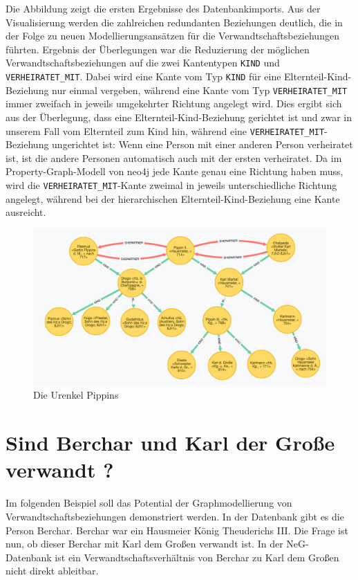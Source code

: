 \documentclass[ngerman,]{scrreprt}
\begin{document}
Die Abbildung zeigt die ersten Ergebnisse des Datenbankimports. Aus der Visualisierung werden die zahlreichen redundanten Beziehungen deutlich, die in der Folge zu neuen Modellierungsansätzen für die Verwandtschaftsbeziehungen führten. Ergebnis der Überlegungen war die Reduzierung der möglichen Verwandtschaftsbeziehungen auf die zwei Kantentypen \texttt{KIND} und \texttt{VERHEIRATET\_MIT}. Dabei wird eine Kante vom Typ \texttt{KIND} für eine Elternteil-Kind-Beziehung nur einmal vergeben, während eine Kante vom Typ \texttt{VERHEIRATET\_MIT} immer zweifach in jeweils umgekehrter Richtung angelegt wird. Dies ergibt sich aus der Überlegung, dass eine Elternteil-Kind-Beziehung gerichtet ist und zwar in unserem Fall vom Elternteil zum Kind hin, während eine \texttt{VERHEIRATET\_MIT}-Beziehung ungerichtet ist: Wenn eine Person mit einer anderen Person verheiratet ist, ist die andere Personen automatisch auch mit der ersten verheiratet. Da im Property-Graph-Modell von neo4j jede Kante genau eine Richtung haben muss, wird die \texttt{VERHEIRATET\_MIT}-Kante zweimal in jeweils unterschiedliche Richtung angelegt, während bei der hierarchischen Elternteil-Kind-Beziehung eine Kante ausreicht.

\begin{figure}
\centering
\includegraphics{Bilder/NeG/030-Urenkel-Pippins.jpg}
\caption{Die Urenkel Pippins}
\end{figure}

\section{Sind Berchar und Karl der Große verwandt ?}\label{sind-berchar-und-karl-der-grouxdfe-verwandt}

Im folgenden Beispiel soll das Potential der Graphmodellierung von Verwandtschaftsbeziehungen demonstriert werden. In der Datenbank gibt es die Person Berchar. Berchar war ein Hausmeier König Theuderichs III. Die Frage ist nun, ob dieser Berchar mit Karl dem Großen verwandt ist. In der NeG-Datenbank ist ein Verwandtschaftsverhältnis von Berchar zu Karl dem Großen nicht direkt ableitbar.
\end{document}
